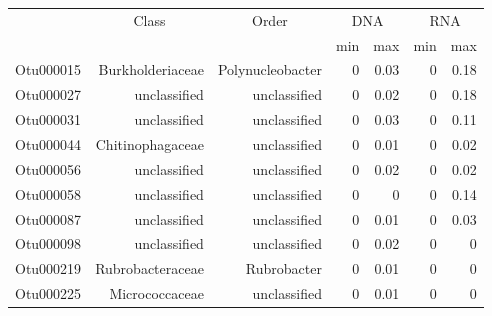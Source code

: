 \begin{table}[ht]
\centering
\begin{tabular}{crrrrrr}
  \hline
  & \multicolumn{1}{c}{Class} & \multicolumn{1}{c}{Order} & 
                      \multicolumn{2}{c}{DNA} & \multicolumn{2}{c}{RNA} \\
 & &  & min & max & min & max \\
 \hline
Otu000015 & Burkholderiaceae & Polynucleobacter & 0 & 0.03 & 0 & 0.18 \\ 
  Otu000027 & unclassified & unclassified & 0 & 0.02 & 0 & 0.18 \\ 
  Otu000031 & unclassified & unclassified & 0 & 0.03 & 0 & 0.11 \\ 
  Otu000044 & Chitinophagaceae & unclassified & 0 & 0.01 & 0 & 0.02 \\ 
  Otu000056 & unclassified & unclassified & 0 & 0.02 & 0 & 0.02 \\ 
  Otu000058 & unclassified & unclassified & 0 & 0 & 0 & 0.14 \\ 
  Otu000087 & unclassified & unclassified & 0 & 0.01 & 0 & 0.03 \\ 
  Otu000098 & unclassified & unclassified & 0 & 0.02 & 0 & 0 \\ 
  Otu000219 & Rubrobacteraceae & Rubrobacter & 0 & 0.01 & 0 & 0 \\ 
  Otu000225 & Micrococcaceae & unclassified & 0 & 0.01 & 0 & 0 \\ 
   \hline
\end{tabular}
\end{table}
